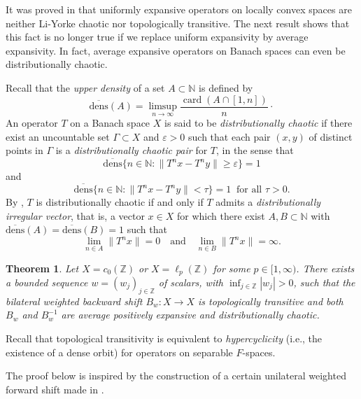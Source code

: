 \documentclass[12pt]{amsart}
\theoremstyle{theorem}
\newtheorem{theorem}{Theorem}%
\theoremstyle{definition}
\theoremstyle{remark} \theoremstyle{question} \theoremstyle{example}
\newcommand{\N}{\mathbb{N}}   %
\newcommand{\Z}{\mathbb{Z}}   %
\newcommand{\eps}{\varepsilon}   %
\newcommand{\card}{\operatorname{card}}
\newcommand{\udens}{\operatorname{\overline{dens}}}
\begin{document}
It was proved in \cite[Theorem~38]{BCDFP} that uniformly expansive operators on locally convex spaces
are neither Li-Yorke chaotic nor topologically transitive.
The next result shows that this fact is no longer true if we replace uniform expansivity by average expansivity.
In fact, average expansive operators on Banach spaces can even be distributionally chaotic.

Recall that the {\em upper density} of a set $A \subset \N$ is defined by
\[
\udens(A) = \limsup_{n \to \infty} \frac{\card(A \cap [1,n])}{n}\cdot
\]
An operator $T$ on a Banach space $X$ is said to be {\em distributionally chaotic} if there exist an uncountable set $\Gamma \subset X$
and $\eps > 0$ such that each pair $(x,y)$ of distinct points in $\Gamma$ is a {\em distributionally chaotic pair} for $T$, in the sense that
\[
\udens\{n \in \N : \|T^nx - T^ny\| \geq \eps\} = 1
\]
and
\[
\udens\{n \in \N : \|T^nx - T^ny\| < \tau\} = 1 \ \text{ for all } \tau > 0.
\]
By \cite[Theorem~12]{BerBonMulPer13}, $T$ is distributionally chaotic if and only if $T$ admits a {\em distributionally irregular vector},
that is, a vector $x \in X$ for which there exist $A,B \subset \N$ with $\udens(A) = \udens(B) = 1$ such that
\[
\lim_{n \in A} \|T^nx\| = 0 \ \ \ \text{ and } \ \ \ \lim_{n \in B} \|T^nx\| = \infty.
\]

\begin{theorem}\label{AE-T3}
Let $X = c_0(\Z)$ or $X = \ell_p(\Z)$ for some $p \in [1,\infty)$.
There exists a bounded sequence $w = (w_j)_{j \in \Z}$ of scalars, with $\inf_{j \in \Z} |w_j| > 0$, such that
the bilateral weighted backward shift $B_w : X \to X$ is topologically transitive and 
both $B_w$ and $B_w^{-1}$ are average positively expansive and distributionally chaotic.
\end{theorem}

Recall that topological transitivity is equivalent to {\em hypercyclicity} (i.e., the existence of a dense orbit) 
for operators on separable $F$-spaces.

The proof below is inspired by the construction of a certain unilateral weighted forward shift made in \cite[Theorem~25]{BerBonPerWu18}.
\end{document}
